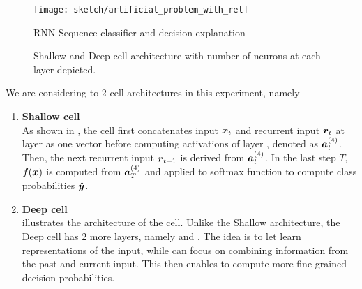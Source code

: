  \begin{figure}[!hbt]
		\centering
		\texttt{[image: sketch/artificial\_problem\_with\_rel]}
		\caption{RNN Sequence classifier and decision explanation} 
		\label{fig:artificial_problem}
\end{figure}


\begin{figure}[!htb]
\centering

     \hfill
\caption{Shallow and Deep cell architecture with number of neurons at each layer depicted.}
\end{figure}

We are considering to 2 cell architectures in this experiment, namely 

\begin{enumerate}
	\item \textbf{Shallow cell} \\
		As shown in \addfigure{\ref{fig:shallow_arch}}, the  cell first concatenates  input $\patvector{x}_t$  and recurrent input $\patvector{r}_t$ at layer  as one vector before computing activations of layer , denoted as $\patvector{a}_t^{(4)}$. Then,  the next recurrent input $\patvector{r}_{t+1}$ 	 is derived from $\patvector{a}_t^{(4)}$. In the last step $T$, $f(\boldsymbol{x})$ is computed from $\patvector{a}^{(4)}_{T}$ and applied to softmax function to compute class probabilities $\patvector{\hat{y}}$. 
	\item \textbf{Deep cell} \\
		\addfigure{\ref{fig:deep_arch}} illustrates the architecture of  the  cell. Unlike the Shallow architecture, the Deep cell has 2 more layers, namely  and .  The idea is to let  learn representations of the input, while  can focus on combining information from the past and current input. This then enables  to compute more fine-grained decision probabilities. 
\end{enumerate}


